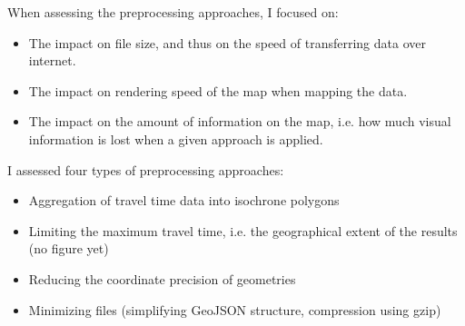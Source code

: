 When assessing the preprocessing approaches, I focused on:
\begin{itemize}
	\item The impact on file size, and thus on the speed of transferring data over internet.
	\item The impact on rendering speed of the map when mapping the data.
	\item The impact on the amount of information on the map,
	i.e. how much visual information is lost when a given approach is applied.
\end{itemize}

I assessed four types of preprocessing approaches:
\begin{itemize}
	\item Aggregation of travel time data into isochrone polygons 
	\item Limiting the maximum travel time, i.e. the geographical extent of the results (no figure yet)
	\item Reducing the coordinate precision of geometries
	\item Minimizing files (simplifying GeoJSON structure, compression using gzip)
\end{itemize}

